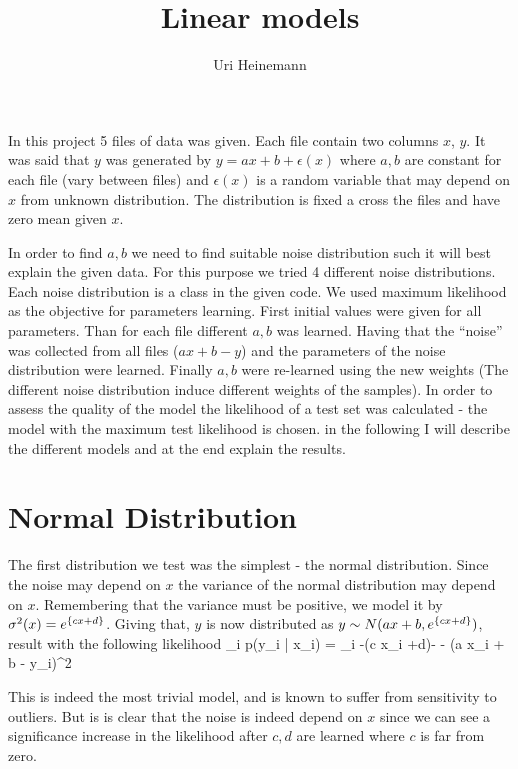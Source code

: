 \documentclass{article}
\title{Linear models}
\author{Uri Heinemann}
\begin{document}
\maketitle
In this project 5 files of data was given.
Each file contain two columns $x$, $y$.
It was said that $y$ was generated by $y = ax+b+\epsilon(x)$ where $a,b$ are constant for each file (vary between files) and $\epsilon(x)$ is a random variable that may depend on $x$ from unknown distribution. The distribution is fixed a cross the files and have zero mean given $x$.

In order to find $a,b$ we need to find suitable noise distribution such it will best explain the given data.
For this purpose we tried 4 different noise distributions.
Each noise distribution is a class in the given code.
We used maximum likelihood as the objective for parameters learning.
First initial values were given for all parameters.
Than for each file different $a,b$ was learned.
Having that the ``noise'' was collected from all files ($ax+b-y$) and the parameters of the noise distribution were learned.
Finally $a,b$ were re-learned using the new weights (The different noise distribution induce different weights of the samples). 
In order to assess the quality of the model the likelihood of a test set was calculated - the model with the maximum test likelihood is chosen.
in the following I will describe the different models and at the end explain the results.
\section{Normal Distribution}
The first distribution we test was the simplest - the normal distribution.
Since the noise may depend on $x$ the variance of the normal distribution may depend on $x$.
Remembering that the variance must be positive, we model it by $\sigma^2(x) = e^{\left\{c x + d\right\}}$.
Giving that, $y$ is now distributed as $y \sim N(ax+b, e^{\left\{cx+d\right\}})$, result with the following likelihood
\be
{} \sum_i \log p(y_i | x_i) =  \sum_i -(c x_i +d)-\log{2\pi} - (a x_i + b - y_i)^2 
\ee

This is indeed the most trivial model, and is known to suffer from sensitivity to outliers.
But is is clear that the noise is indeed depend on $x$ since we can see a significance increase in the likelihood after $c,d$ are learned where $c$ is far from zero.
\end{document}
